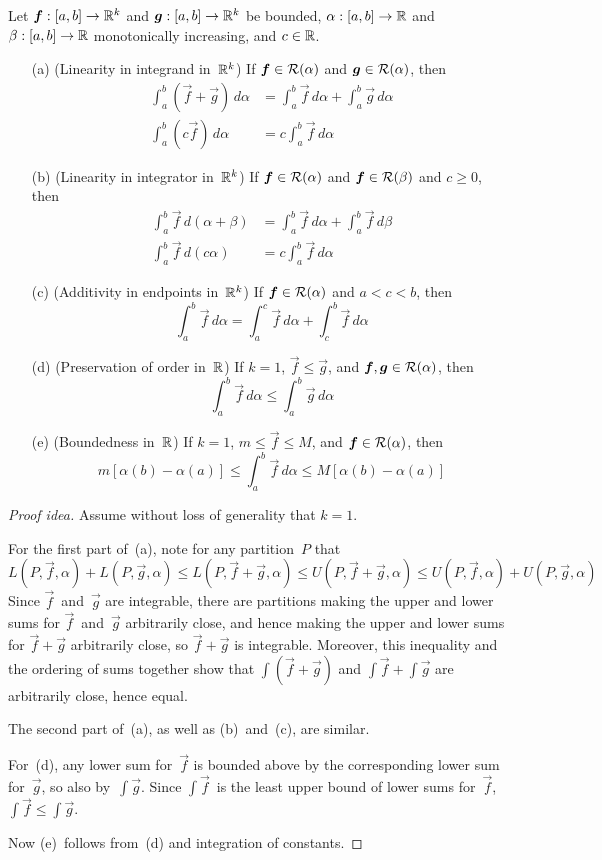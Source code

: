 \begin{thm}
Let \(\boldsymbol{f}:[a,b]\to\mathbb{R}^k\) and \(\boldsymbol{g}:[a,b]\to\mathbb{R}^k\) be bounded, \(\alpha:[a,b]\to\mathbb{R}\) and \(\beta:[a,b]\to\mathbb{R}\) monotonically increasing, and \(c\in\mathbb{R}\).
\begin{enumerate}[itemsep=0pt]
\item[(a)] (Linearity in integrand in~\(\mathbb{R}^k\)) If \(\boldsymbol{f}\in\mathcal{R}(\alpha)\) and \(\boldsymbol{g}\in\mathcal{R}(\alpha)\), then
\begin{align*}
\int_a^b(\vec{f}+\vec{g})\,d\alpha&=\int_a^b\vec{f}\,d\alpha+\int_a^b\vec{g}\,d\alpha\\
\int_a^b(c\vec{f})\,d\alpha&=c\int_a^b\vec{f}\,d\alpha
\end{align*}
\item[(b)] (Linearity in integrator in~\(\mathbb{R}^k\)) If \(\boldsymbol{f}\in\mathcal{R}(\alpha)\) and \(\boldsymbol{f}\in\mathcal{R}(\beta)\) and \(c\ge0\), then
\begin{align*}
\int_a^b\vec{f}\,d(\alpha+\beta)&=\int_a^b\vec{f}\,d\alpha+\int_a^b\vec{f}\,d\beta\\
\int_a^b\vec{f}\,d(c\alpha)&=c\int_a^b\vec{f}\,d\alpha
\end{align*}
\item[(c)] (Additivity in endpoints in~\(\mathbb{R}^k\))
If \(\boldsymbol{f}\in\mathcal{R}(\alpha)\) and \(a<c<b\), then
\[\int_a^b\vec{f}\,d\alpha=\int_a^c\vec{f}\,d\alpha+\int_c^b\vec{f}\,d\alpha\]
\item[(d)] (Preservation of order in~\(\mathbb{R}\)) If \(k=1\), \(\vec{f}\le\vec{g}\), and \(\boldsymbol{f},\boldsymbol{g}\in\mathcal{R}(\alpha)\), then
\[\int_a^b\vec{f}\,d\alpha\le\int_a^b\vec{g}\,d\alpha\]
\item[(e)] (Boundedness in~\(\mathbb{R}\)) If \(k=1\), \(m\le\vec{f}\le M\), and \(\boldsymbol{f}\in\mathcal{R}(\alpha)\), then
\[m[\alpha(b)-\alpha(a)]\le\int_a^b\vec{f}\,d\alpha\le M[\alpha(b)-\alpha(a)]\]
\end{enumerate}
\end{thm}
\begin{proof}[Proof idea]
Assume without loss of generality that \(k=1\).

For the first part of~(a), note for any partition~\(P\) that
\[L(P,\vec{f},\alpha)+L(P,\vec{g},\alpha)\le L(P,\vec{f}+\vec{g},\alpha)\le U(P,\vec{f}+\vec{g},\alpha)\le U(P,\vec{f},\alpha)+U(P,\vec{g},\alpha)\]
Since \(\vec{f}\)~and~\(\vec{g}\) are integrable, there are partitions making the upper and lower sums for \(\vec{f}\)~and~\(\vec{g}\) arbitrarily close, and hence making the upper and lower sums for \(\vec{f}+\vec{g}\) arbitrarily close, so \(\vec{f}+\vec{g}\) is integrable. Moreover, this inequality and the ordering of sums together show that \(\int(\vec{f}+\vec{g})\) and \(\int\vec{f}+\int\vec{g}\) are arbitrarily close, hence equal.

The second part of~(a), as well as (b)~and~(c), are similar.

For~(d), any lower sum for~\(\vec{f}\) is bounded above by the corresponding lower sum for~\(\vec{g}\), so also by~\(\int\vec{g}\). Since \(\int\vec{f}\)~is the least upper bound of lower sums for~\(\vec{f}\), \(\int\vec{f}\le\int\vec{g}\).

Now (e)~follows from~(d) and integration of constants.
\end{proof}

